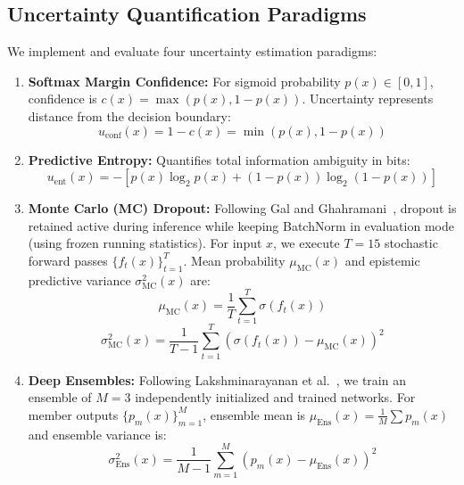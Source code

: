 \documentclass[conference]{IEEEtran}
\begin{document}
\subsection{Uncertainty Quantification Paradigms}
We implement and evaluate four uncertainty estimation paradigms:
\begin{enumerate}
    \item \textbf{Softmax Margin Confidence:} For sigmoid probability $p(x) \in [0, 1]$, confidence is $c(x) = \max(p(x), 1 - p(x))$. Uncertainty represents distance from the decision boundary:
    \begin{equation}
    u_{\text{conf}}(x) = 1 - c(x) = \min(p(x), 1 - p(x))
    \end{equation}
    \item \textbf{Predictive Entropy:} Quantifies total information ambiguity in bits:
    \begin{equation}
    u_{\text{ent}}(x) = -\left[ p(x) \log_2 p(x) + (1 - p(x)) \log_2(1 - p(x)) \right]
    \end{equation}
    \item \textbf{Monte Carlo (MC) Dropout:} Following Gal and Ghahramani~\cite{gal2016dropout}, dropout is retained active during inference while keeping BatchNorm in evaluation mode (using frozen running statistics). For input $x$, we execute $T=15$ stochastic forward passes $\{f_t(x)\}_{t=1}^T$. Mean probability $\mu_{\text{MC}}(x)$ and epistemic predictive variance $\sigma^2_{\text{MC}}(x)$ are:
    \begin{equation}
    \mu_{\text{MC}}(x) = \frac{1}{T} \sum_{t=1}^T \sigma(f_t(x))
    \end{equation}
    \begin{equation}
    \sigma^2_{\text{MC}}(x) = \frac{1}{T - 1} \sum_{t=1}^T \left(\sigma(f_t(x)) - \mu_{\text{MC}}(x)\right)^2
    \end{equation}
    \item \textbf{Deep Ensembles:} Following Lakshminarayanan et al.~\cite{lakshminarayanan2017simple}, we train an ensemble of $M=3$ independently initialized and trained networks. For member outputs $\{p_m(x)\}_{m=1}^M$, ensemble mean is $\mu_{\text{Ens}}(x) = \frac{1}{M} \sum p_m(x)$ and ensemble variance is:
    \begin{equation}
    \sigma^2_{\text{Ens}}(x) = \frac{1}{M - 1} \sum_{m=1}^M \left(p_m(x) - \mu_{\text{Ens}}(x)\right)^2
    \end{equation}
\end{enumerate}
\end{document}
